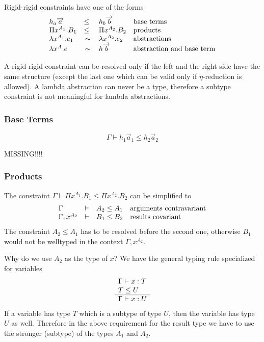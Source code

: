 Rigid-rigid constraints have one of the forms
$$
    \begin{array}{lllll} 
        h_a {\overrightarrow {a}} &\le& h_b {\overrightarrow {b}}
        & \text{base terms}
        \\
        \Pi x^{A_1}. B_1 &\le& \Pi x^{A_2}. B_2
        & \text{products}
        \\
        \lambda x^{A_1}. e_1 &\,\sim\,& \lambda x^{A_2}. e_2
        & \text{abstractions}
        \\
        \lambda x^A. e & \,\sim\, & h {\overrightarrow {b}}
        & \text{abstraction and base term}
     \end{array}
$$

A rigid-rigid constraint can be resolved only if the left and the right side
have the same structure (except the last one which can be valid only if
$\eta$-reduction is allowed). A lambda abstraction can never be a type,
therefore a subtype constraint is not meaningful for lambda abstractions.








\subsubsection{Base Terms}


$$
    \Gamma \vdash h_1 \vec a_1 \le h_2 \vec a_2
$$

MISSING!!!!


\subsubsection{Products}

The constraint $\Gamma \vdash \Pi x^{A_1}. B_1 \le \Pi x^{A_2}. B_2$ can be
simplified to
$$
    \begin{array}{lllll} 
        \Gamma          & \vdash & A_2 \le A_1
        &\text{arguments contravariant}
        \\
        \Gamma, x^{A_2} & \vdash & B_1 \le B_2
        &\text{results covariant}
     \end{array}
$$
%
The constraint $A_2 \le A_1$ has to be resolved before the second one,
otherwise $B_1$ would not be welltyped in the context $\Gamma, x^{A_2}$.

Why do we use $A_2$ as the type of $x$? We have the general typing rule
specialized for variables
$$
    \begin{array}{l} 
        \Gamma \vdash x : T
        \\
        T \le U
     \\ \hline 
        \Gamma \vdash x: U
     \end{array}
$$
If a variable has type $T$ which is a subtype of type $U$, then the variable has
type $U$ as well. Therefore in the above requirement for the result type we have
to use the stronger (subtype) of the types $A_1$ and $A_2$.




